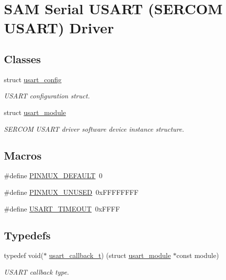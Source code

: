 \hypertarget{group__asfdoc__sam0__sercom__usart__group}{}\section{S\+A\+M Serial U\+S\+A\+R\+T (S\+E\+R\+C\+O\+M U\+S\+A\+R\+T) Driver}
\label{group__asfdoc__sam0__sercom__usart__group}
\subsection*{Classes}
\begin{DoxyCompactItemize}
\item 
struct \hyperlink{structusart__config}{usart\+\_\+config}
\begin{DoxyCompactList}\small\item\em U\+S\+A\+R\+T configuration struct. \end{DoxyCompactList}\item 
struct \hyperlink{structusart__module}{usart\+\_\+module}
\begin{DoxyCompactList}\small\item\em S\+E\+R\+C\+O\+M U\+S\+A\+R\+T driver software device instance structure. \end{DoxyCompactList}\end{DoxyCompactItemize}
\subsection*{Macros}
\begin{DoxyCompactItemize}
\item 
\#define \hyperlink{group__asfdoc__sam0__sercom__usart__group_gae7bc85650aed61f97fe3d5df9b430456}{P\+I\+N\+M\+U\+X\+\_\+\+D\+E\+F\+A\+U\+L\+T}~0
\item 
\#define \hyperlink{group__asfdoc__sam0__sercom__usart__group_gaffde9ff712058ef836127e1f3368889e}{P\+I\+N\+M\+U\+X\+\_\+\+U\+N\+U\+S\+E\+D}~0x\+F\+F\+F\+F\+F\+F\+F\+F
\item 
\#define \hyperlink{group__asfdoc__sam0__sercom__usart__group_gad3e37fdd22ce059c9158a818d608447a}{U\+S\+A\+R\+T\+\_\+\+T\+I\+M\+E\+O\+U\+T}~0x\+F\+F\+F\+F
\end{DoxyCompactItemize}
\subsection*{Typedefs}
\begin{DoxyCompactItemize}
\item 
typedef void($\ast$ \hyperlink{group__asfdoc__sam0__sercom__usart__group_ga1d3e2901d0cf76f20aae271f7122c67d}{usart\+\_\+callback\+\_\+t}) (struct \hyperlink{structusart__module}{usart\+\_\+module} $\ast$const module)
\begin{DoxyCompactList}\small\item\em U\+S\+A\+R\+T callback type. \end{DoxyCompactList}\end{DoxyCompactItemize}
